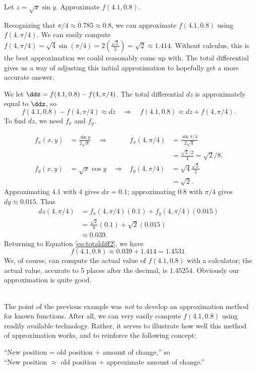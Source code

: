 {Let $z = \sqrt{x}\sin y$. Approximate $f(4.1,0.8)$.}
{Recognizing that $\pi/4 \approx 0.785\approx 0.8$, we can approximate $f(4.1,0.8)$ using $f(4,\pi/4)$. We can easily compute $f(4,\pi/4) = \sqrt{4}\sin(\pi/4) = 2\left(\frac{\sqrt{2}}2\right) = \sqrt{2}\approx 1.414.$ Without calculus, this is the best approximation we could reasonably come up with. The total differential gives us a way of adjusting this initial approximation to hopefully get a more accurate answer.

We let $\ddz = f(4.1,0.8) - f(4,\pi/4)$. The total differential $dz$ is approximately equal to $\ddz$, so
\begin{equation}f(4.1,0.8) - f(4,\pi/4) \approx dz \quad \Rightarrow \quad f(4.1,0.8) \approx dz + f(4,\pi/4).\label{eq:totaldiff2}\end{equation}
To find $dz$, we need $f_x$ and $f_y$.

\begin{align*}
f_x(x,y) &= \frac{\sin y}{2\sqrt{x}} \quad\Rightarrow&
f_x(4,\pi/4) &= \frac{\sin \pi/4}{2\sqrt{4}} \\
						& &&= \frac{\sqrt{2}/2}{4} = \sqrt{2}/8.\\
f_y(x,y) &= \sqrt{x}\cos y \quad\Rightarrow&
f_y(4,\pi/4) &= \sqrt{4}\frac{\sqrt{2}}2\\
		& & &= \sqrt{2}.
\end{align*}
Approximating $4.1$ with 4 gives $dx = 0.1$; approximating $0.8$ with $\pi/4$ gives $dy \approx 0.015$. Thus
\begin{align*}
dz(4,\pi/4) &=  f_x(4,\pi/4)(0.1) + f_y(4,\pi/4)(0.015)\\
				&= \frac{\sqrt{2}}8(0.1) + \sqrt{2}(0.015)\\
				&\approx 0.039.
\end{align*}
Returning to Equation \eqref{eq:totaldiff2}, we have
$$f(4.1,0.8) \approx 0.039 + 1.414 = 1.4531.$$
We, of course, can compute the actual value of $f(4.1,0.8)$ with a calculator; the actual value, accurate to 5 places after the decimal, is $1.45254$. Obviously our approximation is quite good.
}\\

The point of the previous example was \textit{not} to develop an approximation method for known functions. After all, we can very easily compute $f(4.1,0.8)$ using readily available technology. Rather, it serves to illustrate how well this method of approximation works, and to reinforce the following concept:
\begin{center}
	``New position = old position $+$ amount of change,'' so\\
	``New position $\approx$ old position + approximate amount of change.''
\end{center}


